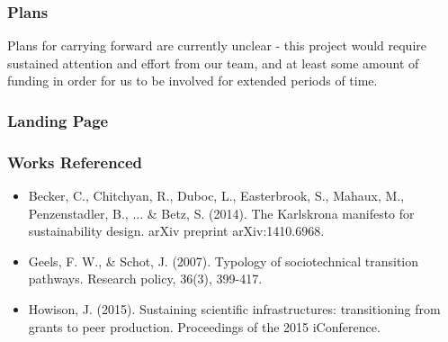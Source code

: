 \subsubsection{Plans}

Plans for carrying forward are currently unclear - this project would require sustained attention and effort from our team, and at least some amount of funding in order for us to be involved for extended periods of time.

\subsubsection{Landing Page}


\subsubsection{Works Referenced}


\begin{itemize}
\item Becker, C., Chitchyan, R., Duboc, L., Easterbrook, S., Mahaux, M., Penzenstadler, B., ... \& Betz, S. (2014). The Karlskrona manifesto for sustainability design. arXiv preprint arXiv:1410.6968.
\item Geels, F. W., \& Schot, J. (2007). Typology of sociotechnical transition pathways. Research policy, 36(3), 399-417.
\item Howison, J. (2015). Sustaining scientific infrastructures: transitioning from grants to peer production. Proceedings of the 2015 iConference. 
\end{itemize}
